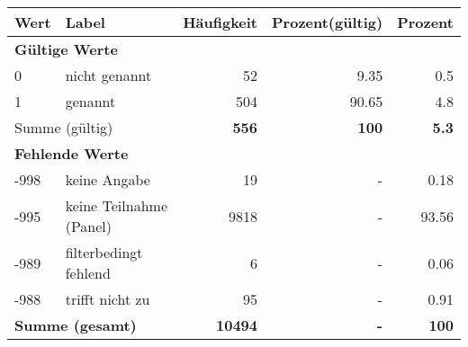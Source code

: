      \begin{longtable}{lXrrr}
     \toprule
     \textbf{Wert} & \textbf{Label} & \textbf{Häufigkeit} & \textbf{Prozent(gültig)} & \textbf{Prozent} \\
     \endhead
     \midrule
     \multicolumn{5}{l}{\textbf{Gültige Werte}}\\

     0 &
     \multicolumn{1}{X}{ nicht genannt   } &


       \num{52} &
       \num[round-mode=places,round-precision=2]{9.35} &
         \num[round-mode=places,round-precision=2]{0.5} \\

     1 &
     \multicolumn{1}{X}{ genannt   } &


       \num{504} &
       \num[round-mode=places,round-precision=2]{90.65} &
         \num[round-mode=places,round-precision=2]{4.8} \\
     \midrule
     \multicolumn{2}{l}{Summe (gültig)} &
       \textbf{\num{556}} &
     \textbf{\num{100}} &
       \textbf{\num[round-mode=places,round-precision=2]{5.3}} \\
     \multicolumn{5}{l}{\textbf{Fehlende Werte}}\\
       -998 &
       keine Angabe &
         \num{19} &
        - &
         \num[round-mode=places,round-precision=2]{0.18} \\
       -995 &
       keine Teilnahme (Panel) &
         \num{9818} &
        - &
         \num[round-mode=places,round-precision=2]{93.56} \\
       -989 &
       filterbedingt fehlend &
         \num{6} &
        - &
         \num[round-mode=places,round-precision=2]{0.06} \\
       -988 &
       trifft nicht zu &
         \num{95} &
        - &
         \num[round-mode=places,round-precision=2]{0.91} \\
     \midrule
     \multicolumn{2}{l}{\textbf{Summe (gesamt)}} &
          \textbf{\num{10494}} &
        \textbf{-} &
        \textbf{\num{100}} \\
     \bottomrule
     \end{longtable}
     
